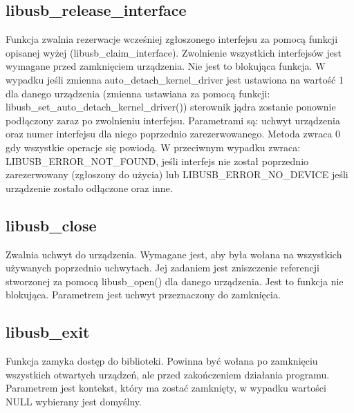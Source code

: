 \documentclass{BscUS}
\begin{document}
\subsection{libusb\_release\_interface}
\noindent Funkcja zwalnia rezerwacje wcześniej zgłoszonego interfejsu za pomocą funkcji opisanej wyżej (libusb\_claim\_interface).
Zwolnienie wszystkich interfejsów jest wymagane przed zamknięciem urządzenia.
Nie jest to blokująca funkcja.
W wypadku jeśli zmienna auto\_detach\_kernel\_driver jest ustawiona na wartość 1 dla danego urządzenia (zmienna ustawiana za pomocą funkcji: libusb\_set\_auto\_detach\_kernel\_driver()) sterownik jądra zostanie ponownie podłączony zaraz po zwolnieniu interfejsu.
Parametrami są: uchwyt urządzenia oraz numer interfejsu dla niego poprzednio zarezerwowanego.
\newline
Metoda zwraca 0 gdy wszystkie operacje się powiodą.
W przeciwnym wypadku zwraca: LIBUSB\_ERROR\_NOT\_FOUND, jeśli interfejs nie został poprzednio zarezerwowany (zgłoszony do użycia) lub LIBUSB\_ERROR\_NO\_DEVICE jeśli urządzenie zostało odłączone oraz inne.
\subsection{libusb\_close}
\noindent Zwalnia uchwyt do urządzenia.
Wymagane jest, aby była wołana na wszystkich używanych poprzednio uchwytach.
Jej zadaniem jest zniszczenie referencji stworzonej za pomocą libusb\_open() dla danego urządzenia.
Jest to funkcja nie blokująca.
Parametrem jest uchwyt przeznaczony do zamknięcia.

\subsection{libusb\_exit}
\noindent Funkcja zamyka dostęp do biblioteki.
Powinna być wołana po zamknięciu wszystkich otwartych urządzeń, ale przed zakończeniem działania programu.
Parametrem jest kontekst, który ma zostać zamknięty, w wypadku wartości NULL wybierany jest domyślny.
\end{document}
